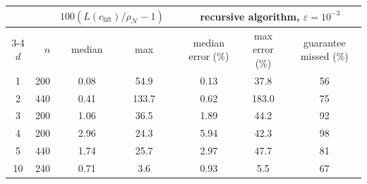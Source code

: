 \begin{tabular}{cr cc c ccc}
\toprule
 & & \multicolumn{2}{c}{$100(L(c_{\mathrm{lift}})/\rho_\mathcal{N}-1)$} & & \multicolumn{3}{c}{recursive algorithm, $\varepsilon=10^{-3}$}\\
\cmidrule{3-4}\cmidrule{6-8}
$d$ & $n$ & median & max & & median error (\%) & max error (\%) & guarantee missed (\%)\\
\midrule
1 & 200 & 0.08 & 54.9 & & 0.13 & 37.8 & 56\\
2 & 440 & 0.41 & 133.7 & & 0.62 & 183.0 & 75\\
3 & 200 & 1.06 & 36.5 & & 1.89 & 44.2 & 92\\
4 & 200 & 2.96 & 24.3 & & 5.94 & 42.3 & 98\\
5 & 440 & 1.74 & 25.7 & & 2.97 & 47.7 & 81\\
10 & 240 & 0.71 & 3.6 & & 0.93 & 5.5 & 67\\
\bottomrule
\end{tabular}